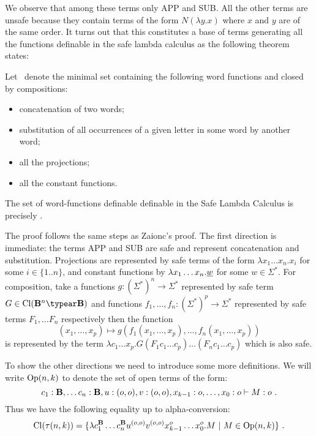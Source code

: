 We observe that among these terms only {\rm APP} and {\rm SUB}. All the other terms are unsafe because they contain terms of the form $ N (\lambda y .x)$ where $x$ and $y$ are of the same order. It turns out that this constitutes a base of terms generating all the functions definable in the safe lambda calculus as the following theorem states:
\begin{theorem}
\label{thm:wordfunctions_safely_definable}
Let \safedefset\ denote the minimal set containing the following word functions and closed by compositions:
\begin{itemize}
  \item concatenation of two words;
  \item substitution of all occurrences of a given letter in some word by another word;
  \item all the projections;
  \item all the constant functions.
\end{itemize}
The set of word-functions definable definable in the Safe Lambda Calculus is precisely
\safedefset.
\end{theorem}

The proof follows the same steps as Zaionc's proof.
The first direction is immediate: the terms {\rm APP} and {\rm SUB} are safe 
and represent concatenation and substitution. Projections are represented by safe terms of the form $\lambda x_1 \ldots x_n . x_i$ for some $i\in\{1..n\}$, and constant
functions by $\lambda x_1 \ldots x_n . \underline{w}$ for some $w\in\Sigma^*$.
For composition, take a functions $g:(\Sigma^*)^n \rightarrow \Sigma^*$ represented by safe term $G\in \closedof{\zaiwordtyp^n \typear \zaiwordtyp}$ and functions $f_1,\ldots,f_n :
(\Sigma^*)^p \rightarrow \Sigma^*$ represented by
safe terms $F_1,\ldots F_n$ respectively then the function $$(x_1,\ldots,x_p) \mapsto g(f_1(x_1,\ldots,x_p),\ldots,f_n(x_1,\ldots,x_p))$$ is represented by the term
$\lambda c_1\ldots x_p. G (F_1 c_1 \ldots c_p)\ldots (F_n c_1 \ldots c_p)$ which is also safe.
\bigskip

To show the other directions we need to introduce some more definitions.
We will write ${\rm Op}(n,k)$ to denote the set of open terms
of the form:
$$c_1:\mathbf{B}, \ldots c_n :\mathbf{B}, u:(o,o), v:(o,o), x_{k-1}:o, \ldots, x_0 :o \vdash M : o \ .$$
Thus  we have the following equality up to alpha-conversion:
$$\closedof{\tau(n,k)} = \{ \lambda c_1^\zaiwordtyp \ldots c_n^\zaiwordtyp u^{(o,o)} v^{(o,o)} x_{k-1}^o \ldots x_0^o . M \ | \ M \in \openedof{n}{k}  \} \ .$$

